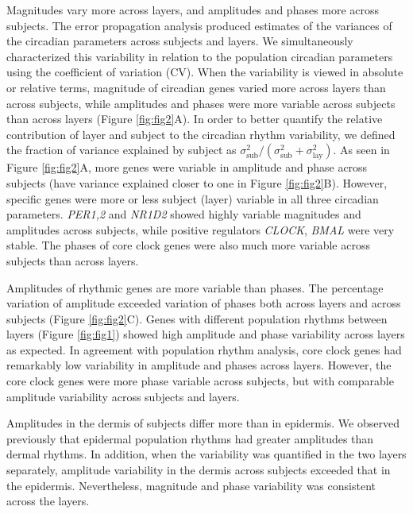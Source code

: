 Magnitudes vary more across layers, and amplitudes and phases more across subjects. The error propagation analysis produced estimates of the variances of the circadian parameters across subjects and layers. We simultaneously characterized this variability in relation to the population circadian parameters using the coefficient of variation (CV). When the variability is viewed in absolute or relative terms, magnitude of circadian genes varied more across layers than across subjects, while amplitudes and phases were more variable across subjects than across layers (Figure \ref{fig:fig2}A). In order to better quantify the relative contribution of layer and subject to the circadian rhythm variability, we defined the fraction of variance explained by subject as $\sigma^2_\textrm{sub}/(\sigma^2_\textrm{sub} + \sigma^2_\textrm{lay})$. As seen in Figure \ref{fig:fig2}A, more genes were variable in amplitude and phase across subjects (have variance explained closer to one in Figure \ref{fig:fig2}B). However, specific genes were more or less subject (layer) variable in all three circadian parameters. \textit{PER1,2} and \textit{NR1D2} showed highly variable magnitudes and amplitudes across subjects, while positive regulators \textit{CLOCK}, \textit{BMAL} were very stable. The phases of core clock genes were also much more variable across subjects than across layers. 

Amplitudes of rhythmic genes are more variable than phases. The percentage variation of amplitude exceeded variation of phases both across layers and across subjects (Figure \ref{fig:fig2}C). Genes with different population rhythms between layers (Figure \ref{fig:fig1}) showed high amplitude and phase variability across layers as expected. In agreement with population rhythm analysis, core clock genes had remarkably low variability in amplitude and phases across layers. However, the core clock genes were more phase variable across subjects, but with comparable amplitude variability across subjects and layers. 

Amplitudes in the dermis of subjects differ more than in epidermis. We observed previously that epidermal population rhythms had greater amplitudes than dermal rhythms. In addition, when the variability was quantified in the two layers separately, amplitude variability in the dermis across subjects exceeded that in the epidermis. Nevertheless, magnitude and phase variability was consistent across the layers. 

